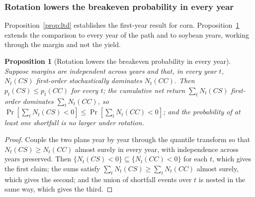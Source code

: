 \documentclass[11pt,letterpaper]{article}
\newtheorem{theorem}{Proposition}
\theoremstyle{remark}
\begin{document}
\begin{table}[H]
\centering
\caption{Check of the conditions of Proposition~\ref{prop:ltd}, medium NCCPI zone. Breakeven yield $\bar y=\bar K/\bar P$ (bu/ac); $F_{CC}$ and $F_{CS}$ are the percent of simulated corn yields below $\bar y$ under continuous corn and corn after soybeans in an alternation; the fifth column is the difference in mean yield (bu/ac); the last is $F_{CC}$ at the threshold $(\bar K+\delta_C)/\bar P$.}
\label{tab:th_ltd}

\end{table}

\subsubsection{\label{subsubsec:proposition_2}Rotation lowers the breakeven probability in every year}

Proposition~\ref{prop:ltd} establishes the first-year result for corn. Proposition~\ref{prop:path} extends the comparison to every year of the path and to soybean years, working through the margin and not the yield.

\begin{theorem}[Rotation lowers the breakeven probability in every year]
\label{prop:path}
Suppose margins are independent across years and that, in every year $t$, $N_t(CS)$ first-order stochastically dominates $N_t(CC)$. Then $p_t(CS)\le p_t(CC)$ for every $t$; the cumulative net return $\sum_t N_t(CS)$ first-order dominates $\sum_t N_t(CC)$, so $\Pr[\sum_t N_t(CS)<0]\le\Pr[\sum_t N_t(CC)<0]$; and the probability of at least one shortfall is no larger under rotation.
\end{theorem}

\begin{proof}
Couple the two plans year by year through the quantile transform so that $N_t(CS)\ge N_t(CC)$ almost surely in every year, with independence across years preserved. Then $\{N_t(CS)<0\}\subseteq\{N_t(CC)<0\}$ for each $t$, which gives the first claim; the sums satisfy $\sum_tN_t(CS)\ge\sum_tN_t(CC)$ almost surely, which gives the second; and the union of shortfall events over $t$ is nested in the same way, which gives the third.
\end{proof}
\end{document}

